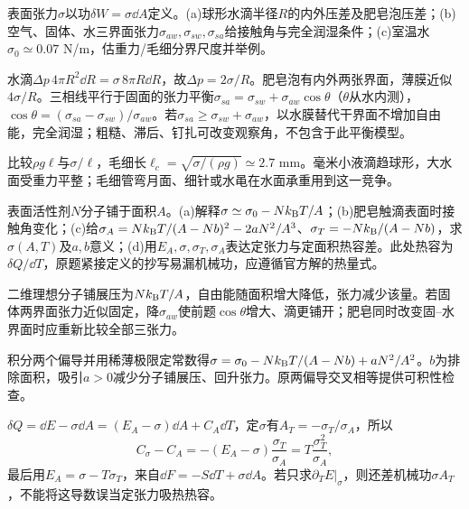 \begin{exercise}[原题1(a)--(c)]\label{r:333-1-1}
表面张力$\sigma$以功$\delta W=\sigma\dd A$定义。(a)球形水滴半径$R$的内外压差及肥皂泡压差；(b)空气、固体、水三界面张力$\sigma_{aw},\sigma_{sw},\sigma_{sa}$给接触角与完全润湿条件；(c)室温水$\sigma_0\simeq0.07$ N/m，估重力/毛细分界尺度并举例。
\end{exercise}
\begin{solution}
水滴$\Delta p\,4\pi R^2\dd R=\sigma\,8\pi R\dd R$，故$\Delta p=2\sigma/R$。肥皂泡有内外两张界面，薄膜近似$4\sigma/R$。三相线平行于固面的张力平衡$\sigma_{sa}=\sigma_{sw}+\sigma_{aw}\cos\theta$（$\theta$从水内测），$\cos\theta=(\sigma_{sa}-\sigma_{sw})/\sigma_{aw}$。若$\sigma_{sa}\ge\sigma_{sw}+\sigma_{aw}$，以水膜替代干界面不增加自由能，完全润湿；粗糙、滞后、钉扎可改变观察角，不包含于此平衡模型。

比较$\rho g\ell$与$\sigma/\ell$，毛细长$\ell_c=\sqrt{\sigma/(\rho g)}\simeq2.7$ mm。毫米小液滴趋球形，大水面受重力平整；毛细管弯月面、细针或水黾在水面承重用到这一竞争。
\end{solution}
\begin{exercise}[原题2(a)--(d)]\label{r:333-1-2}
表面活性剂$N$分子铺于面积$A$。(a)解释$\sigma\simeq\sigma_0-Nk_{\mathrm B} T/A$；(b)肥皂触滴表面时接触角变化；(c)给$\sigma_A=Nk_{\mathrm B} T/(A-Nb)^2-2aN^2/A^3$、$\sigma_T=-Nk_{\mathrm B}/(A-Nb)$，求$\sigma(A,T)$及$a,b$意义；(d)用$E_A,\sigma,\sigma_T,\sigma_A$表达定张力与定面积热容差。此处热容为$\delta Q/\dd T$，原题紧接定义的抄写易漏机械功，应遵循官方解的热量式。
\end{exercise}
\begin{solution}
二维理想分子铺展压为$Nk_{\mathrm B} T/A$，自由能随面积增大降低，张力减少该量。若固体两界面张力近似固定，降$\sigma_{aw}$使前题$\cos\theta$增大、滴更铺开；肥皂同时改变固--水界面时应重新比较全部三张力。

积分两个偏导并用稀薄极限定常数得$\sigma=\sigma_0-Nk_{\mathrm B} T/(A-Nb)+aN^2/A^2$。$b$为排除面积，吸引$a>0$减少分子铺展压、回升张力。原两偏导交叉相等提供可积性检查。

$\delta Q=\dd E-\sigma\dd A=(E_A-\sigma)\dd A+C_A\dd T$，定$\sigma$有$A_T=-\sigma_T/\sigma_A$，所以
\begin{equation}
C_\sigma-C_A=-(E_A-\sigma)\frac{\sigma_T}{\sigma_A}=T\frac{\sigma_T^2}{\sigma_A},
\end{equation}
最后用$E_A=\sigma-T\sigma_T$，来自$\dd F=-S\dd T+\sigma\dd A$。若只求$\partial_TE|_\sigma$，则还差机械功$\sigma A_T$，不能将这导数误当定张力吸热热容。
\end{solution}
